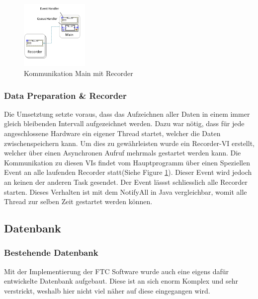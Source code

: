 \documentclass[10pt]{scrartcl}
\begin{document}
\begin{figure}
	\begin{center}
		\includegraphics[width=0.29\textwidth]{pictures/LauftzeitansichtRecorderNah}
		\caption{Kommunikation Main mit Recorder}
		\label{fig:LauftzeitansichtRecorder}
	\end{center}
\end{figure}
\subsubsection{Data Preparation \& Recorder}
Die Umsetztung setzte voraus, dass das Aufzeichnen aller Daten in einem immer gleich bleibenden Intervall aufgezeichnet werden. Dazu war nötig, dass für jede angeschlossene Hardware ein eigener Thread startet, welcher die Daten zwischenspeichern kann. Um dies zu gewährleisten wurde ein Recorder-\gls{VI} erstellt, welcher über einen Asynchronen Aufruf mehrmals gestartet werden kann. Die Kommunikation zu diesen \gls{VI}s findet vom Hauptprogramm über einen Speziellen Event an alle laufenden Recorder statt(Siehe Figure \ref{fig:LauftzeitansichtRecorder}). Dieser Event wird jedoch an keinen der anderen Task gesendet. Der Event lässst schliesslich alle Recorder starten. Dieses Verhalten ist mit dem NotifyAll in Java vergleichbar, womit alle Thread zur selben Zeit gestartet werden können. 

\subsection{Datenbank}
\subsubsection{Bestehende Datenbank}
Mit der Implementierung der FTC Software wurde auch eine eigens dafür entwickelte Datenbank aufgebaut. Diese ist an sich enorm Komplex und sehr verstrickt, weshalb hier nicht viel näher auf diese eingegangen wird.
\end{document}
